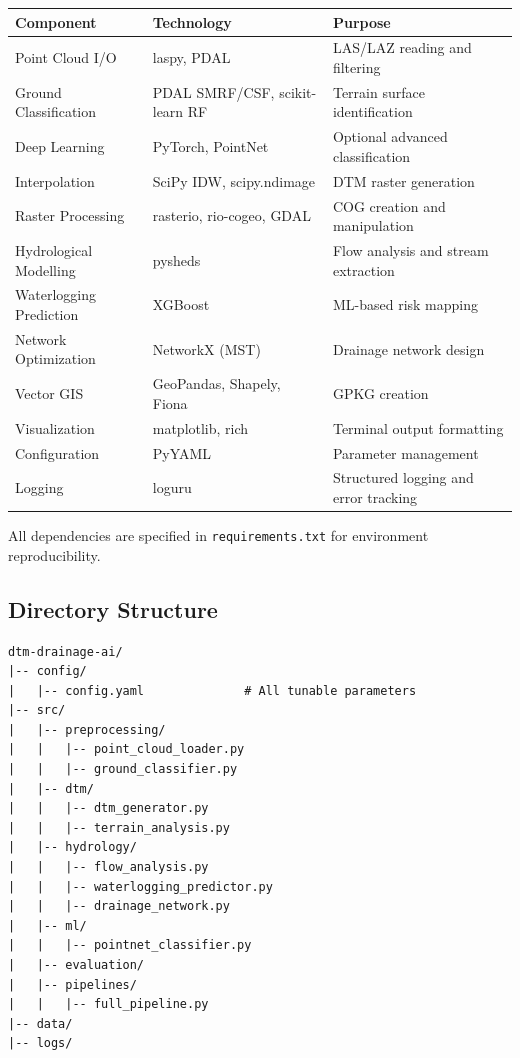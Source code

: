 \documentclass[a4paper,12pt]{article}
\begin{document}
\begin{longtable}{lll}
	\toprule
	\textbf{Component}      & \textbf{Technology}            & \textbf{Purpose}                      \\
	\midrule
	Point Cloud I/O         & laspy, PDAL                    & LAS/LAZ reading and filtering         \\
	Ground Classification   & PDAL SMRF/CSF, scikit-learn RF & Terrain surface identification        \\
	Deep Learning           & PyTorch, PointNet              & Optional advanced classification      \\
	Interpolation           & SciPy IDW, scipy.ndimage       & DTM raster generation                 \\
	Raster Processing       & rasterio, rio-cogeo, GDAL      & COG creation and manipulation         \\
	Hydrological Modelling  & pysheds                        & Flow analysis and stream extraction   \\
	Waterlogging Prediction & XGBoost                        & ML-based risk mapping                 \\
	Network Optimization    & NetworkX (MST)                 & Drainage network design               \\
	Vector GIS              & GeoPandas, Shapely, Fiona      & GPKG creation                         \\
	Visualization           & matplotlib, rich               & Terminal output formatting            \\
	Configuration           & PyYAML                         & Parameter management                  \\
	Logging                 & loguru                         & Structured logging and error tracking \\
	\bottomrule
\end{longtable}

All dependencies are specified in \texttt{requirements.txt} for environment reproducibility.

\subsection{Directory Structure}

\begin{verbatim}
dtm-drainage-ai/
|-- config/
|   |-- config.yaml              # All tunable parameters
|-- src/
|   |-- preprocessing/
|   |   |-- point_cloud_loader.py
|   |   |-- ground_classifier.py
|   |-- dtm/
|   |   |-- dtm_generator.py
|   |   |-- terrain_analysis.py
|   |-- hydrology/
|   |   |-- flow_analysis.py
|   |   |-- waterlogging_predictor.py
|   |   |-- drainage_network.py
|   |-- ml/
|   |   |-- pointnet_classifier.py
|   |-- evaluation/
|   |-- pipelines/
|   |   |-- full_pipeline.py
|-- data/
|-- logs/
\end{verbatim}
\end{document}
